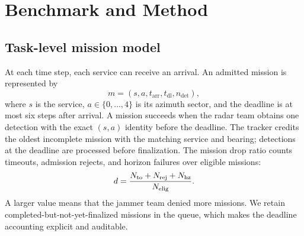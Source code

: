 \section{Benchmark and Method}
\subsection{Task-level mission model}
At each time step, each service can receive an arrival. An admitted mission is represented by
\begin{equation}
 m=(s,a,t_{\mathrm{arr}},t_{\mathrm{dl}},n_{\mathrm{det}}),
\end{equation}
where $s$ is the service, $a\in\{0,\ldots,4\}$ is its azimuth sector, and the deadline is at most six steps after arrival. A mission succeeds when the radar team obtains one detection with the exact $(s,a)$ identity before the deadline. The tracker credits the oldest incomplete mission with the matching service and bearing; detections at the deadline are processed before finalization. The mission drop ratio counts timeouts, admission rejects, and horizon failures over eligible missions:
\begin{equation}
 d=\frac{N_{\mathrm{to}}+N_{\mathrm{rej}}+N_{\mathrm{hz}}}{N_{\mathrm{elig}}}.
\end{equation}
A larger value means that the jammer team denied more missions. We retain completed-but-not-yet-finalized missions in the queue, which makes the deadline accounting explicit and auditable.

